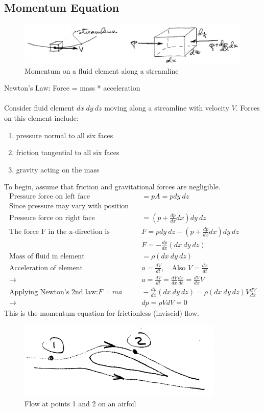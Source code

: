 \documentclass[draft=false, titlepage]{article}
\begin{document}
\subsection{Momentum Equation}
\begin{figure}[ht]
	\centering
	\includegraphics[width=0.8\linewidth]{Figures/p5_momentum.PNG}
	\caption{Momentum on a fluid element along a streamline}
	\label{fig:p5_momentum}
\end{figure}
Newton's Law: Force = mass * acceleration
\paragraph*{} Consider fluid element $dx\ dy\ dz$ moving along a streamline with velocity $V$. Forces on this element include:
\begin{enumerate}
	\item pressure normal to all six faces
	\item friction tangential to all six faces
	\item gravity acting on the mass
\end{enumerate}
To begin, assume that friction and gravitational forces are negligible.
\begin{align*}
\text{Pressure force on left face} &\quad = pA = p dy\ dz\\
\text{Since pressure may vary with position}&\\
\text{Pressure force on right face} &\quad = (p + \frac{dp}{dx}dx) dy\ dz\\
\text{The force F in the x-direction is}
&\quad F=p dy\ dz - (p + \frac{dp}{dx}dx)dy\ dz\\
&\quad F = -\frac{dp}{dx}(dx\ dy\ dz)\\
\text{Mass of fluid in element} &\quad = \rho (dx\ dy\ dz)\\
\text{Acceleration of element} &\quad a = \frac{dV}{dt},\quad \text{Also } V = \frac{dx}{dt}\\
\rightarrow &\quad a = \frac{dV}{dt} = \frac{dV}{dx}\frac{dx}{dt} = \frac{dV}{dx}V\\
\text{Applying Newton's 2nd law:} F=ma &\quad -\frac{dp}{dx}(dx\ dy\ dz) = \rho(dx\ dy\ dz) V \frac{dV}{dx}\\
\rightarrow &\quad dp = \rho V dV = 0
\end{align*}
This is the momentum equation for frictionless (inviscid) flow.
\begin{figure}[ht]
	\centering
	\includegraphics[width=0.3\linewidth]{Figures/p6_flowOnAirfoil.PNG}
	\caption{Flow at points 1 and 2 on an airfoil}
	\label{fig:p6_flowOnAirfoil}
\end{figure}
\end{document}
